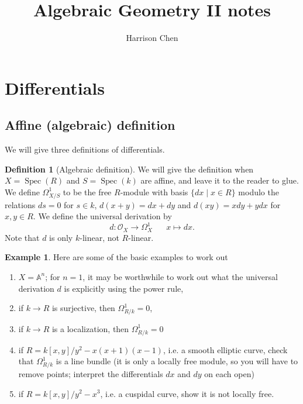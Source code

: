 \documentclass[10pt]{article}
\title{Algebraic Geometry II notes}
\author{Harrison Chen}
\theoremstyle{definition}
\newtheorem{exmp}[thm]{Example}
\newtheorem{defn}[thm]{Definition}
\DeclareMathOperator{\Spec}{Spec}
\newcommand{\OO}{\mathcal{O}}
\begin{document}
\maketitle
\tableofcontents

\newpage




\section{Differentials}

\subsection{Affine (algebraic) definition}


We will give three definitions of differentials.

\begin{defn}[Algebraic definition]
We will give the definition when $X = \Spec(R)$ and $S = \Spec(k)$ are affine, and leave it to the reader to glue.  We define $\Omega^1_{X/S}$ to be the free $R$-module with basis $\{dx \mid x \in R\}$ modulo the relations $ds = 0$ for $s \in k$, $d(x+y)=dx + dy$ and $d(xy) = xdy + ydx$ for $x,y\in R$.  We define the universal derivation by
$$d: \OO_X \rightarrow \Omega^1_X \;\;\;\;\;\; x \mapsto dx.$$
Note that $d$ is only $k$-linear, not $R$-linear.
\end{defn}

\begin{exmp}
Here are some of the basic examples to work out
\begin{enumerate}
\item $X = \mathbb{A}^n$; for $n=1$, it may be worthwhile to work out what the universal derivation $d$ is explicitly using the power rule,
\item if $k \rightarrow R$ is surjective, then $\Omega^1_{R/k} = 0$, 
\item if $k \rightarrow R$ is a localization, then $\Omega^1_{R/k} = 0$
\item if $R = k[x, y]/y^2 - x(x+1)(x-1)$, i.e. a smooth elliptic curve, check that $\Omega^1_{R/k}$ is a line bundle (it is only a locally free module, so you will have to remove points; interpret the differentials $dx$ and $dy$ on each open)
\item if $R = k[x,y]/y^2 - x^3$, i.e. a cuspidal curve, show it is not locally free.
\end{enumerate}
\end{exmp}
\end{document}
